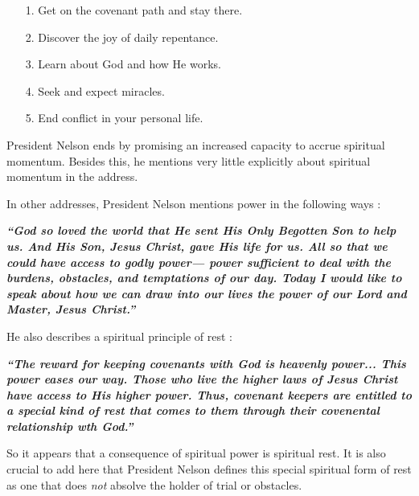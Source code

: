 \documentclass{article}
\begin{document}
            \begin{enumerate}
                \item [1.] Get on the covenant path and stay there.
                \item [2.] Discover the joy of daily repentance.
                \item [3.] Learn about God and how He works.
                \item [4.] Seek and expect miracles.
                \item [5.] End conflict in your personal life.
            \end{enumerate}

            President Nelson ends by promising an increased capacity to accrue spiritual momentum. Besides this, he mentions very little explicitly about spiritual momentum in the address. 

            In other addresses, President Nelson mentions power in the following ways \cite{Nelson2}: 

            \begin{center}
                \textbf{\textit{``God so loved the world that He sent His Only Begotten Son to help us. 
                And His Son, Jesus Christ, gave His life for us. 
                All so that we could have access to godly power— power sufficient to deal with the burdens, obstacles, and temptations of our day. 
                Today I would like to speak about how we can draw into our lives the power of our Lord and Master, Jesus Christ.''
                }}
            \end{center}

            He also describes a spiritual principle of rest \cite{Nelson3}: 

            \begin{center}
                \textbf{\textit{``The reward for keeping covenants with God is heavenly power... This power eases our way. Those who live the higher laws of Jesus Christ have access to His higher power.
                Thus, covenant keepers are entitled to a special kind of rest that comes to them through their covenental relationship wth God.''}}
            \end{center}

            So it appears that a consequence of spiritual power is spiritual rest. It is also crucial to add here that President Nelson defines this special spiritual form of rest as one that does \emph{not} absolve the holder of trial or obstacles. 
            
\end{document}
